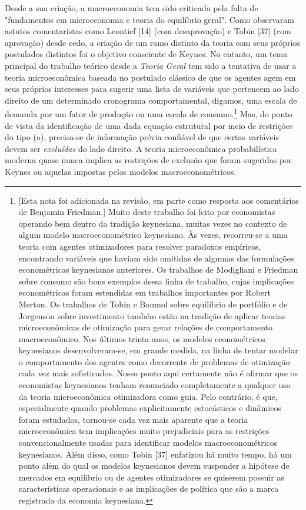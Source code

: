 \documentclass[12pt]{article}
\begin{document}
Desde a sua criação, a macroeconomia tem sido criticada pela falta de "fundamentos em microeconomia e teoria do equilíbrio geral". Como observaram astutos comentaristas como Leontief [14] (com desaprovação) e Tobin [37] (com aprovação) desde cedo, a criação de um ramo distinto da teoria com seus próprios postulados distintos foi o objetivo consciente de Keynes. No entanto, um tema principal do trabalho teórico desde a \textit{Teoria Geral} tem sido a tentativa de usar a teoria microeconômica baseada no postulado clássico de que os agentes agem em seus próprios interesses para sugerir uma lista de variáveis que pertencem ao lado direito de um determinado cronograma comportamental, digamos, uma escala de demanda por um fator de produção ou uma escala de consumo.\footnote{[Esta nota foi adicionada na revisão, em parte como resposta aos comentários de Benjamin Friedman.] Muito deste trabalho foi feito por economistas operando bem dentro da tradição keynesiana, muitas vezes no contexto de algum modelo macroeconométrico keynesiano. Às vezes, recorreu-se a uma teoria com agentes otimizadores para resolver paradoxos empíricos, encontrando variáveis que haviam sido omitidas de algumas das formulações econométricas keynesianas anteriores. Os trabalhos de Modigliani e Friedman sobre consumo são bons exemplos dessa linha de trabalho, cujas implicações econométricas foram estendidas em trabalhos importantes por Robert Merton. Os trabalhos de Tobin e Baumol sobre equilíbrio de portfólio e de Jorgenson sobre investimento também estão na tradição de aplicar teorias microeconômicas de otimização para gerar relações de comportamento macroeconômico. Nos últimos trinta anos, os modelos econométricos keynesianos desenvolveram-se, em grande medida, na linha de tentar modelar o comportamento dos agentes como decorrente de problemas de otimização cada vez mais sofisticados. Nosso ponto aqui certamente não é afirmar que os economistas keynesianos tenham renunciado completamente a qualquer uso da teoria microeconômica otimizadora como guia. Pelo contrário, é que, especialmente quando problemas explicitamente estocásticos e dinâmicos foram estudados, tornou-se cada vez mais aparente que a teoria microeconômica tem implicações muito prejudiciais para as restrições convencionalmente usadas para identificar modelos macroeconométricos keynesianos. Além disso, como Tobin [37] enfatizou há muito tempo, há um ponto além do qual os modelos keynesianos devem suspender a hipótese de mercados em equilíbrio ou de agentes otimizadores se quiserem possuir as características operacionais e as implicações de política que são a marca registrada da economia keynesiana.} Mas, do ponto de vista da identificação de uma dada equação estrutural por meio de restrições do tipo (a), precisa-se de informação prévia confiável de que certas variáveis devem ser \textit{excluídas} do lado direito. A teoria microeconômica probabilística moderna quase nunca implica as restrições de exclusão que foram sugeridas por Keynes ou aquelas impostas pelos modelos macroeconométricos.
\end{document}
